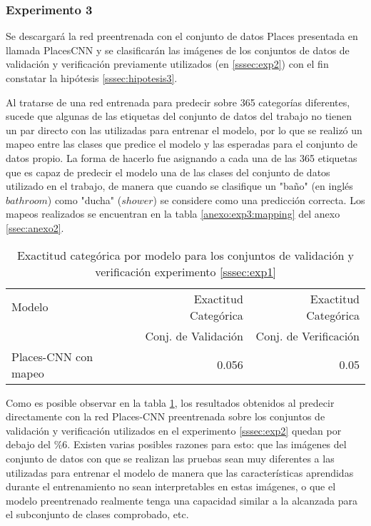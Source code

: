 \subsubsection{Experimento 3} \label{sssec:exp3}
Se descargará la red preentrenada con el conjunto de datos Places presentada en \cite{learning_deep_features} llamada PlacesCNN y se clasificarán las imágenes de los conjuntos de datos de validación y verificación previamente utilizados (en \ref{sssec:exp2}) con el fin constatar la hipótesis \ref{sssec:hipotesis3}.

Al tratarse de una red entrenada para predecir sobre 365 categorías diferentes, sucede que algunas de las etiquetas del conjunto de datos del trabajo \cite{learning_deep_features} no tienen un par directo con las utilizadas para entrenar el modelo, por lo que se realizó un mapeo entre las clases que predice el modelo y las esperadas para el conjunto de datos propio. La forma de hacerlo fue asignando a cada una de las 365 etiquetas que es capaz de predecir el modelo una de las clases del conjunto de datos utilizado en el trabajo, de manera que cuando se clasifique un "baño" (en inglés \(bathroom\)) como "ducha" (\(shower\)) se considere como una predicción correcta. Los mapeos realizados se encuentran en la tabla \ref{anexo:exp3:mapping} del anexo \ref{ssec:anexo2}. 

\begin{table}[h!]
	\centering
	\begin{tabular}{| l | r | r |}
		\toprule
		Modelo & Exactitud Categórica &  Exactitud Categórica \\
		{} & Conj. de Validación &  Conj. de Verificación \\
		\midrule
		Places-CNN con mapeo & 0.056 & 0.05 \\
		\bottomrule
	\end{tabular}
	\caption{Exactitud categórica por modelo para los conjuntos de validación y verificación experimento \ref{sssec:exp1}}
	\label{exp3:results}
\end{table}

Como es posible observar en la tabla \ref{exp3:results}, los resultados obtenidos al predecir directamente con la red Places-CNN preentrenada sobre los conjuntos de validación y verificación utilizados en el experimento \ref{sssec:exp2} quedan por debajo del \%6. Existen varias posibles razones para esto: que las imágenes del conjunto de datos con que se realizan las pruebas sean muy diferentes a las utilizadas para entrenar el modelo de manera que las características aprendidas durante el entrenamiento no sean interpretables en estas imágenes, o que el modelo preentrenado realmente tenga una capacidad similar a la alcanzada para el subconjunto de clases comprobado, etc.

